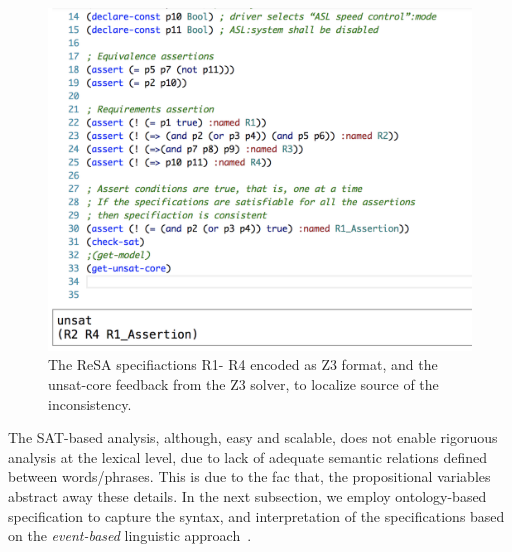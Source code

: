 \begin{figure}[h]
	\centering
	\includegraphics[width=0.7\linewidth]{images/z3}
	\caption{The ReSA specifiactions R1- R4 encoded as Z3 format, and the unsat-core feedback from the Z3 solver, to localize source of the inconsistency.}
	\label{fig_z3}
\end{figure}

The SAT-based analysis, although, easy and scalable, does not enable rigoruous analysis at the lexical level, due to lack of adequate semantic relations defined between words/phrases. This is due to the fac that, the propositional variables abstract away these details. In the next subsection, we employ ontology-based specification to capture the syntax, and interpretation of the specifications based on the \textit{event-based} linguistic approach~\cite{Mahmud2017SpecificationLogic}.

